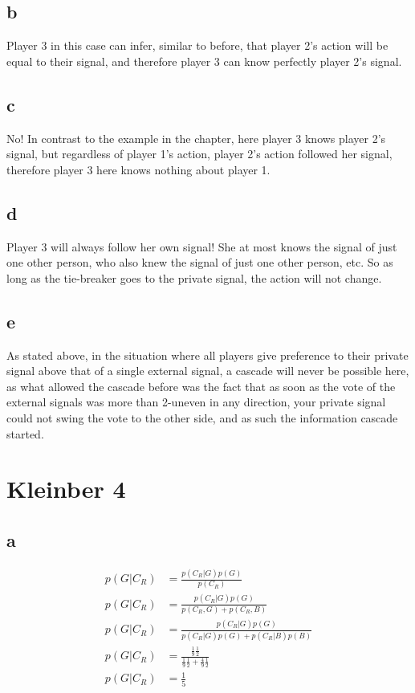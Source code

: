 \documentclass[a4paper,12pt]{article}
\begin{document}
\subsection*{b}
Player 3 in this case can infer, similar to before, that player 2's action will be equal to their signal, and therefore player 3 can know perfectly player 2's signal.

\subsection*{c}
No! In contrast to the example in the chapter, here player 3 knows player 2's signal, but regardless of player 1's action, player 2's action followed her signal, therefore player 3 here knows nothing about player 1.

\subsection*{d}
Player 3 will always follow her own signal! She at most knows the signal of just one other person, who also knew the signal of just one other person, etc. So as long as the tie-breaker goes to the private signal, the action will not change.

\subsection*{e}
As stated above, in the situation where all players give preference to their private signal above that of a single external signal, a cascade will never be possible here, as what allowed the cascade before was the fact that as soon as the vote of the external signals was more than 2-uneven in any direction, your private signal could not swing the vote to the other side, and as such the information cascade started.

\section*{Kleinber 4}

\subsection*{a}

\begin{align*}
p(G | C_R) &= \frac{ p(C_R | G) p(G)}{p(C_R)} \\
p(G | C_R) &= \frac{ p(C_R | G) p(G)}{ p(C_R, G) + p(C_R, B)} \\
p(G | C_R) &= \frac{ p(C_R | G) p(G)}{ p(C_R | G)p(G) + p(C_R | B)p(B)} \\
p(G | C_R) &= \frac{ \frac{1}{9} \frac{1}{2}}{ \frac{1}{9}\frac{1}{2} + \frac{4}{9}\frac{1}{2}} \\
p(G | C_R) &= \frac{1}{5}
\end{align*}
\end{document}
